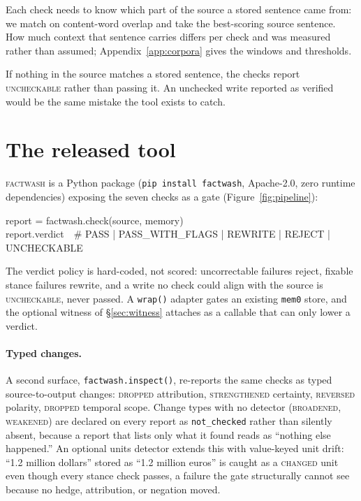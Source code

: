 \documentclass[11pt]{article}
\newcommand{\sys}{\textsc{factwash}\xspace}
\begin{document}
Each check needs to know which part of the source a stored sentence came from: we match
on content-word overlap and take the best-scoring source sentence. How much context that
sentence carries differs per check and was measured rather than assumed;
Appendix~\ref{app:corpora} gives the windows and thresholds.

If nothing in the source matches a stored sentence, the checks report \textsc{uncheckable}
rather than passing it. An unchecked write reported as verified would be the same mistake
the tool exists to catch.

\section{The released tool}
\label{sec:tool}

\sys is a Python package (\texttt{pip install factwash}, Apache-2.0, zero runtime
dependencies) exposing the seven checks as a gate (Figure~\ref{fig:pipeline}):

\begin{promptbox}
report = factwash.check(source, memory)\\
report.verdict\ \ \# PASS | PASS\_WITH\_FLAGS | REWRITE | REJECT | UNCHECKABLE
\end{promptbox}

The verdict policy is hard-coded, not scored: uncorrectable failures reject, fixable
stance failures rewrite, and a write no check could align with the source is
\textsc{uncheckable}, never passed. A \texttt{wrap()} adapter gates an existing
\texttt{mem0} store, and the optional witness of \S\ref{sec:witness} attaches as a
callable that can only lower a verdict.

\paragraph{Typed changes.} A second surface, \texttt{factwash.inspect()}, re-reports the
same checks as typed source-to-output changes: \textsc{dropped} attribution,
\textsc{strengthened} certainty, \textsc{reversed} polarity, \textsc{dropped} temporal
scope. Change types with no detector (\textsc{broadened}, \textsc{weakened}) are
declared on every report as \texttt{not\_checked} rather than silently absent, because a
report that lists only what it found reads as ``nothing else happened.'' An optional
units detector \citep{quantulum3} extends this with value-keyed unit drift: ``1.2
million dollars'' stored as ``1.2 million euros'' is caught as a \textsc{changed} unit
even though every stance check passes, a failure the gate structurally cannot see
because no hedge, attribution, or negation moved.
\end{document}
